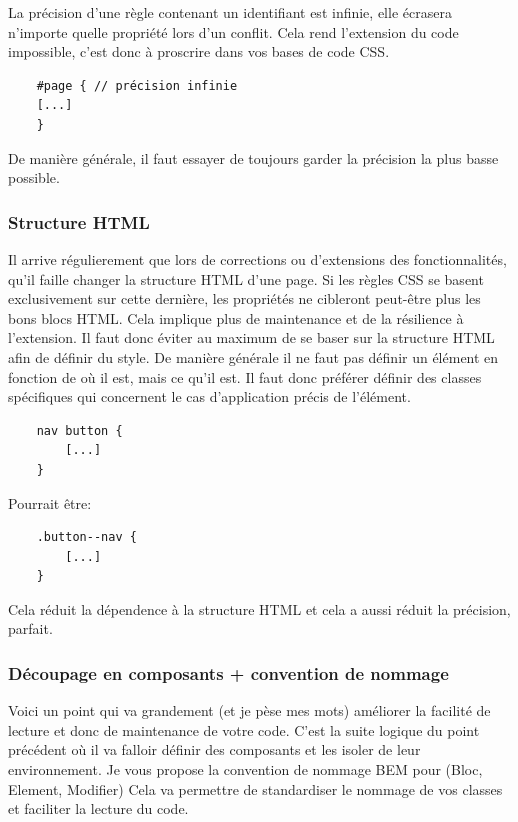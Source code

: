 \documentclass[12pt, a4paper]{report}
\begin{document}
La précision d'une règle contenant un identifiant est infinie, elle écrasera n'importe quelle propriété lors d'un conflit.
Cela rend l'extension du code impossible, c'est donc à proscrire dans vos bases de code CSS.

\begin{lstlisting}
    #page { // précision infinie
    [...]
    }
\end{lstlisting}

De manière générale, il faut essayer de toujours garder la précision la plus basse possible.


\subsubsection{Structure HTML}

Il arrive régulierement que lors de corrections ou d'extensions des fonctionnalités, qu'il faille changer la structure HTML d'une page.
Si les règles CSS se basent exclusivement sur cette dernière, les propriétés ne cibleront peut-être plus les bons blocs HTML.
Cela implique plus de maintenance et de la résilience à l'extension.
Il faut donc éviter au maximum de se baser sur la structure HTML afin de définir du style.
De manière générale il ne faut pas définir un élément en fonction de où il est, mais ce qu'il est.
Il faut donc préférer définir des classes spécifiques qui concernent le cas d'application précis de l'élément.

\begin{lstlisting}
    nav button {
        [...]
    }
\end{lstlisting}

Pourrait être:

\begin{lstlisting}
    .button--nav {
        [...]
    }
\end{lstlisting}

Cela réduit la dépendence à la structure HTML et cela a aussi réduit la précision, parfait.

\subsubsection{Découpage en composants + convention de nommage}

Voici un point qui va grandement (et je pèse mes mots) améliorer la facilité de lecture et donc de maintenance de votre code.
C'est la suite logique du point précédent où il va falloir définir des composants et les isoler de leur environnement.
Je vous propose la convention de nommage BEM pour (Bloc, Element, Modifier)
Cela va permettre de standardiser le nommage de vos classes et faciliter la lecture du code.
\end{document}
